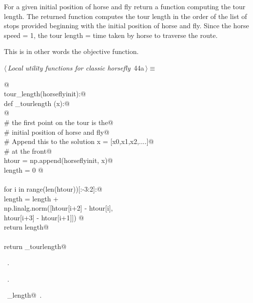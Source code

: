 \documentclass[11.5pt]{report}
\begin{document}
\newchunk  For a given initial position of horse and fly
   return a function computing the tour length. 
   The returned function computes the tour length 
   in the order of the list of stops provided beginning 
   with the initial position of horse and fly. Since 
   the horse speed = 1, the tour length = time taken 
   by horse to traverse the route.

   This is in other words the objective function. 

\begin{flushleft} \small\label{scrap52}\raggedright\small
{} $\langle\,${\itshape Local utility functions for classic horsefly}\nobreak\ {\footnotesize {44a}}$\,\rangle\equiv$
\vspace{-1ex}
\begin{list}{}{} \item
\mbox{}\verb@   @\\
\mbox{}\verb@def tour_length(horseflyinit):@\\
\mbox{}\verb@   def _tourlength (x):@\\
\mbox{}\verb@         @\\
\mbox{}\verb@        # the first point on the tour is the@\\
\mbox{}\verb@        # initial position of horse and fly@\\
\mbox{}\verb@        # Append this to the solution x = [x0,x1,x2,....]@\\
\mbox{}\verb@        # at the front@\\
\mbox{}\verb@        htour = np.append(horseflyinit, x)@\\
\mbox{}\verb@        length = 0 @\\
\mbox{}\verb@@\\
\mbox{}\verb@        for i in range(len(htour))[:-3:2]:@\\
\mbox{}\verb@                length = length + \@\\
\mbox{}\verb@                         np.linalg.norm([htour[i+2] - htour[i], \@\\
\mbox{}\verb@                                         htour[i+3] - htour[i+1]]) @\\
\mbox{}\verb@        return length@\\
\mbox{}\verb@@\\
\mbox{}\verb@   return _tourlength@\\
\mbox{}\verb@@{\NWsep}
\end{list}
\vspace{-1.5ex}
\footnotesize
\begin{list}{}{\setlength{\itemsep}{-\parsep}\setlength{\itemindent}{-\leftmargin}}
\item \NWtxtMacroDefBy\ .
\item \NWtxtMacroRefIn\ .
\item \NWtxtIdentsDefed\nobreak\  \verb@tour_length@\nobreak\ .
\item{}
\end{list}
\vspace{4ex}
\end{flushleft}
\end{document}
